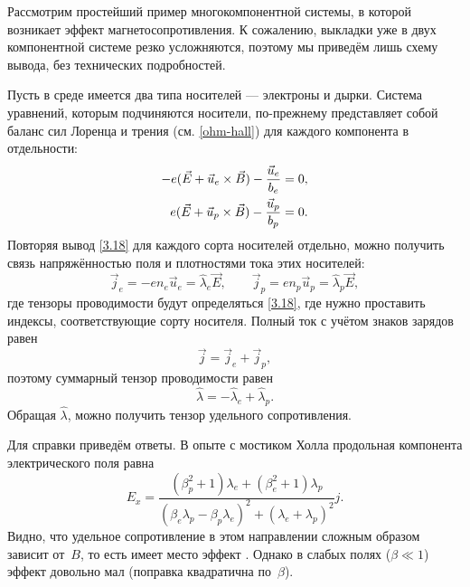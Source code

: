 \begin{lab:example}
Рассмотрим простейший пример многокомпонентной системы, в которой возникает
эффект магнетосопротивления. К сожалению, выкладки уже в двух компонентной
системе резко усложняются, поэтому мы приведём лишь схему вывода, без
технических подробностей.

Пусть в среде имеется два типа носителей --- электроны и дырки. Система
уравнений, которым подчиняются носители, по-прежнему представляет собой баланс
сил Лоренца и трения (см. \eqref{ohm-hall}) для каждого компонента в
отдельности:
\begin{equation}
    \eqmark{two-component}
    \begin{aligned}
-e(\vec{E}+\vec{u}_e\times \vec{B}) - \frac{\vec{u}_e}{b_e} &=0,\\
e(\vec{E}+\vec{u}_p\times \vec{B}) - \frac{\vec{u}_p}{b_p} &=0.
\end{aligned}
\end{equation}
Повторяя вывод \eqref{3.18} для каждого сорта носителей отдельно, можно
получить связь напряжённостью поля и плотностями тока этих носителей:
\begin{equation}
    \vec{j}_e = -en_e \vec{u}_e = \widehat{\lambda}_e \vec{E},\qquad
    \vec{j}_p = en_p \vec{u}_p = \widehat{\lambda}_p \vec{E},
\end{equation}
где тензоры проводимости будут определяться \eqref{3.18}, где нужно проставить
индексы, соответствующие сорту носителя.
Полный ток с учётом знаков зарядов равен
\[
\vec{j} = \vec{j}_e + \vec{j}_p,
\]
поэтому суммарный тензор проводимости равен
\[
\widehat{\lambda} = -\widehat{\lambda}_e + \widehat{\lambda}_p.
\]
Обращая $\widehat{\lambda}$, можно получить тензор удельного сопротивления.

Для справки приведём ответы.
В опыте с мостиком Холла продольная компонента электрического поля равна
\[
E_x = \frac{(\beta_p^2+1) \lambda_e+ (\beta_e^2 +1)\lambda_p}%
{ (\beta_e \lambda_p-\beta_p \lambda_e)^2 + (\lambda_e+\lambda_p)^2}
j.
\]
Видно, что удельное сопротивление в этом направлении сложным образом
зависит от~$B$, то есть имеет место эффект .
Однако в слабых полях ($\beta \ll 1$) эффект довольно мал (поправка
квадратична по~$\beta$).


\end{lab:example}
